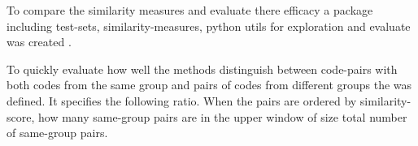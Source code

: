 \documentclass[../main.tex]{subfiles}
\begin{document}
To compare the similarity measures and evaluate there efficacy a package including test-sets,
similarity-measures, python utils for exploration and evaluate was created .

To quickly evaluate how well the methods distinguish between code-pairs with both codes from the same group and pairs of codes from different groups the  was defined.
It specifies the following ratio.
When the pairs are ordered by similarity-score, how many same-group pairs are in the upper window of size total number of same-group pairs.
\end{document}
